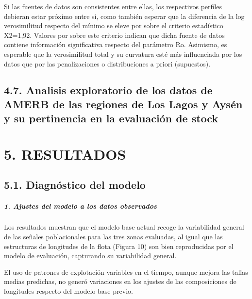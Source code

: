 \documentclass[
]{article}
\begin{document}
Si las fuentes de datos son consistentes entre ellas, los respectivos
perfiles debieran estar próximo entre sí, como también esperar que la
diferencia de la log verosimilitud respecto del mínimo se eleve por
sobre el criterio estadístico X2=1,92. Valores por sobre este criterio
indican que dicha fuente de datos contiene información significativa
respecto del parámetro Ro. Asimismo, es esperable que la verosimilitud
total y su curvatura esté más influenciada por los datos que por las
penalizaciones o distribuciones a priori (supuestos).

\hypertarget{analisis-exploratorio-de-los-datos-de-amerb-de-las-regiones-de-los-lagos-y-aysuxe9n-y-su-pertinencia-en-la-evaluaciuxf3n-de-stock}{%
\subsection{4.7. Analisis exploratorio de los datos de AMERB de las
regiones de Los Lagos y Aysén y su pertinencia en la evaluación de
stock}\label{analisis-exploratorio-de-los-datos-de-amerb-de-las-regiones-de-los-lagos-y-aysuxe9n-y-su-pertinencia-en-la-evaluaciuxf3n-de-stock}}

\pagebreak

\hypertarget{resultados}{%
\section{5. RESULTADOS}\label{resultados}}

\hypertarget{diagnuxf3stico-del-modelo-1}{%
\subsection{5.1. Diagnóstico del
modelo}\label{diagnuxf3stico-del-modelo-1}}

\hypertarget{ajustes-del-modelo-a-los-datos-observados}{%
\subparagraph{\texorpdfstring{\textbf{\emph{1. Ajustes del modelo a los
datos
observados}}}{1. Ajustes del modelo a los datos observados}}\label{ajustes-del-modelo-a-los-datos-observados}}

Los resultados muestran que el modelo base actual recoge la variabilidad
general de las señales poblacionales para las tres zonas evaluadas, al
igual que las estructuras de longitudes de la flota (Figura 10) son bien
reproducidas por el modelo de evaluación, capturando su variabilidad
general.

El uso de patrones de explotación variables en el tiempo, aunque mejora
las tallas medias predichas, no generó variaciones en los ajustes de las
composiciones de longitudes respecto del modelo base previo.
\end{document}
